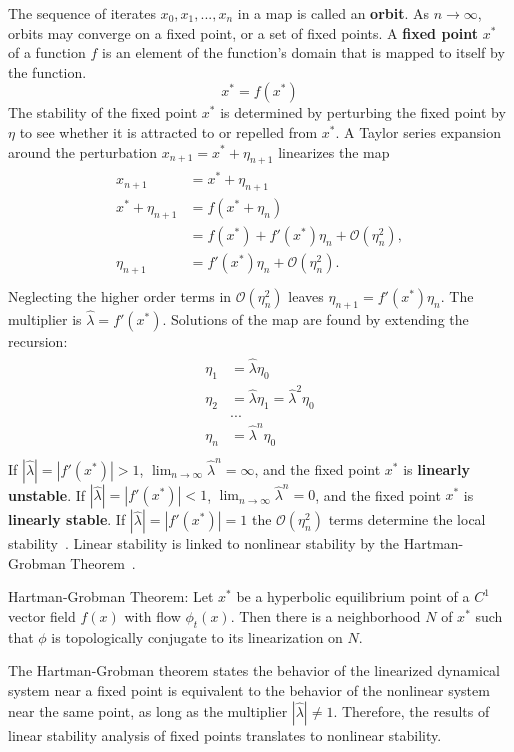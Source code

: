 The sequence of iterates ${x_0,x_1,...,x_n}$ in a map is
called an \textbf{orbit}. As $n \to \infty$, orbits may converge on a fixed point, or a
set of fixed points. A \textbf{fixed point} $x^*$ of a function $f$ is an element of the
function's domain that is mapped to itself by the function. 
\begin{equation*}
x^* = f(x^*)
\end{equation*}
The stability of the fixed point $x^*$ is
determined by perturbing the fixed point by $\eta$ to see whether it is
attracted to or repelled from $x^*$. A Taylor series expansion around
the perturbation $x_{n+1} = x^* + \eta_{n+1}$ linearizes the map
\begin{align*}
\begin{split}
x_{n+1} &= x^* + \eta_{n+1}\\
x^* + \eta_{n+1} &= f(x^* + \eta_n)\\
&= f(x^*) + f'(x^*)\eta_n + \mathcal{O}(\eta_n^2),\\
\eta_{n+1} &= f'(x^*)\eta_n + \mathcal{O}(\eta_n^2).\\
\end{split}
\end{align*}
Neglecting the higher order terms in $\mathcal{O}(\eta_n^2)$ leaves
$\eta_{n+1} = f'(x^*)\eta_n$. The multiplier is $\hat{\lambda} =
f'(x^*)$. Solutions of the map are found by extending the recursion:
\begin{align*}
\begin{split}
\eta_{1} &= \hat{\lambda}\eta_0\\
\eta_{2} &= \hat{\lambda}\eta_1 = \hat{\lambda}^2\eta_0\\
&...\\
\eta_{n} &=\hat{\lambda}^n\eta_0\\
\end{split}
\end{align*}
If $|\hat{\lambda}| = |f'(x^*)| > 1$, $\lim_{n \to \infty}\hat{\lambda}^n = \infty$, and
the fixed point $x^*$ is \textbf{linearly unstable}. If $|\hat{\lambda}| = |f'(x^*)| < 1$, $\lim_{n \to
  \infty}\hat{\lambda}^n = 0$, and the fixed point $x^*$ is
\textbf{linearly stable}. If
$|\hat{\lambda}| = |f'(x^*)| = 1$ the $\mathcal{O}(\eta_n^2)$ terms
determine the local stability~\cite{strogatz}. Linear stability is
linked to nonlinear stability by the Hartman-Grobman Theorem~\cite{meiss}.
\begin{singlespace}
\begin{theorem}
Hartman-Grobman Theorem: Let $x^*$ be a hyperbolic equilibrium point of a $C^1$
vector field $f(x)$ with flow $\phi_t(x)$. Then there is a
neighborhood $N$ of $x^*$ such that $\phi$ is topologically conjugate to its linearization on $N$.
\end{theorem}
\end{singlespace}
The Hartman-Grobman theorem states the behavior of the linearized
dynamical system near a fixed point is equivalent to the
behavior of the nonlinear system near the same point, as long as the
multiplier $|\hat{\lambda}|\neq 1$. Therefore, the results of linear stability
analysis of fixed points translates to nonlinear stability. 

